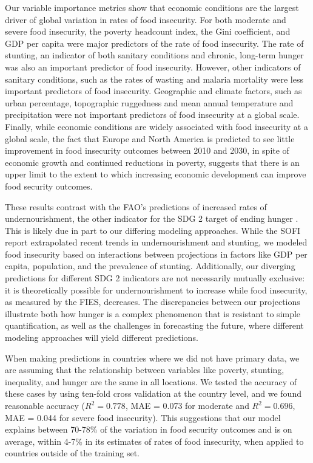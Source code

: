 \documentclass{article}
\begin{document}
Our variable importance metrics show that economic conditions are the largest driver of global variation in rates of food insecurity.  For both moderate and severe food insecurity, the poverty headcount index, the Gini coefficient, and GDP per capita were major predictors of the rate of food insecurity.  The rate of stunting, an indicator of both sanitary conditions and chronic, long-term hunger was also an important predictor of food insecurity.  However, other indicators of sanitary conditions, such as the rates of wasting and malaria mortality were less important predictors of food insecurity.  Geographic and climate factors, such as urban percentage, topographic ruggedness and mean annual temperature and precipitation were not important predictors of food insecurity at a global scale.  Finally, while economic conditions are widely associated with food insecurity at a global scale, the fact that Europe and North America is predicted to see little improvement in food insecurity outcomes between 2010 and 2030, in spite of economic growth and continued reductions in poverty, suggests that there is an upper limit to the extent to which increasing economic development can improve food security outcomes.

These results contrast with the FAO's predictions of increased rates of undernourishment, the other indicator for the SDG 2 target of ending hunger \citep[Part 1, Page 11]{sofi2020}.  This is likely due in part to our differing modeling approaches. While the SOFI report extrapolated recent trends in undernourishment and stunting, we modeled food insecurity based on interactions between projections in factors like GDP per capita, population, and the prevalence of stunting. Additionally, our diverging predictions for different SDG 2 indicators are not necessarily mutually exclusive: it is theoretically possible for undernourishment to increase while food insecurity, as measured by the FIES, decreases.  The discrepancies between our projections illustrate both how hunger is a complex phenomenon that is resistant to simple quantification, as well as the challenges in forecasting the future, where different modeling approaches will yield different predictions.

When making predictions in countries where we did not have primary data, we are assuming that the relationship between variables like poverty, stunting, inequality, and hunger are the same in all locations.  We tested the accuracy of these cases by using ten-fold cross validation at the country level, and we found reasonable accuracy ($R^2 = 0.778$, MAE = 0.073 for moderate and $R^2 = 0.696$, MAE = 0.044 for severe food insecurity).  This suggestions that our model explains between 70-78\% of the variation in food security outcomes and is on average, within 4-7\% in its estimates of rates of food insecurity, when applied to countries outside of the training set. 
\end{document}
